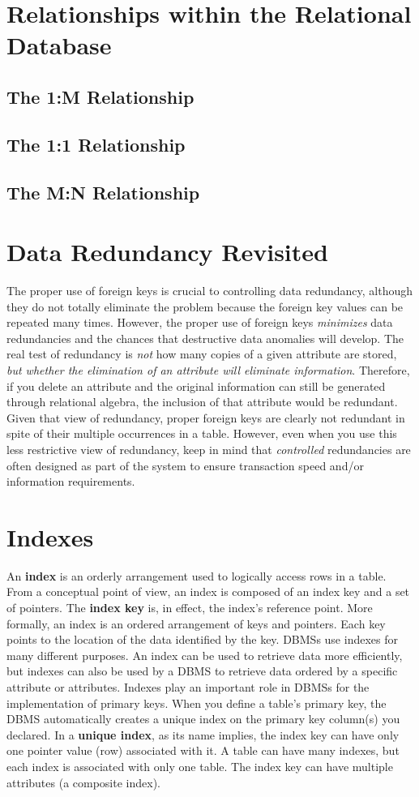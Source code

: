 \documentclass[a4paper, 12pt, titlepage]{report}
\begin{document}
{\section{Relationships within the Relational Database}
\subsection{The 1:M Relationship}
\subsection{The 1:1 Relationship}
\subsection{The M:N Relationship}
\section{Data Redundancy Revisited}
The proper use of foreign keys is crucial to controlling data redundancy, although they do not totally eliminate the problem because the foreign key values can be repeated many times. However, the proper use of foreign keys \emph{minimizes} data redundancies and the chances that destructive data anomalies will develop. The real test of redundancy is \emph{not} how many copies of a given attribute are stored, \emph{but whether the elimination of an attribute will eliminate information}. Therefore, if you delete an attribute and the original information can still be generated through relational algebra, the inclusion of that attribute would be redundant. Given that view of redundancy, proper foreign keys are clearly not redundant in spite of their multiple occurrences in a table. However, even when you use this less restrictive view of redundancy, keep in mind that \emph{controlled} redundancies are often designed as part of the system to ensure transaction speed and/or information requirements.
\section{Indexes}
An \textbf{index} is an orderly arrangement used to logically access rows in a table. From a conceptual point of view, an index is composed of an index key and a set of pointers. The \textbf{index key} is, in effect, the index’s reference point. More formally, an index is an ordered arrangement of keys and pointers. Each key points to the location of the data identified by the key. DBMSs use indexes for many different purposes. An index can be used to retrieve data more efficiently, but indexes can also be used by a DBMS to retrieve data ordered by a specific attribute or attributes. Indexes play an important role in DBMSs for the implementation of primary keys. When you define a table’s primary key, the DBMS automatically creates a unique index on the primary key column(s) you declared. In a \textbf{unique index}, as its name implies, the index key can have only one pointer value (row) associated with it. A table can have many indexes, but each index is associated with only one table. The index key can have multiple attributes (a composite index).\pagebreak
}
\end{document}
